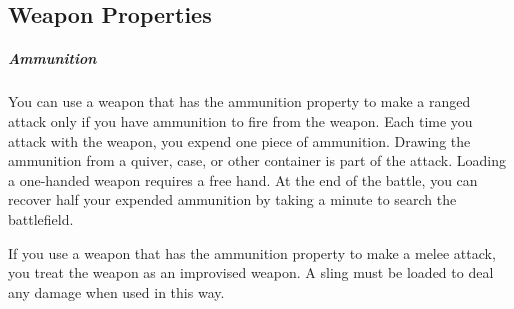 

\subsection*{Weapon Properties} \label{ssec::weaponproperties}

    \subparagraph{Ammunition} You can use a weapon that has the ammunition property to make a ranged attack only if you have ammunition to fire from the weapon.
    Each time you attack with the weapon, you expend one piece of ammunition.
    Drawing the ammunition from a quiver, case, or other container is part of the attack.
    Loading a one-handed weapon requires a free hand.
    At the end of the battle, you can recover half your expended ammunition by taking a minute to search the battlefield.

    If you use a weapon that has the ammunition property to make a melee attack, you treat the weapon as an improvised weapon.
    A sling must be loaded to deal any damage when used in this way.

